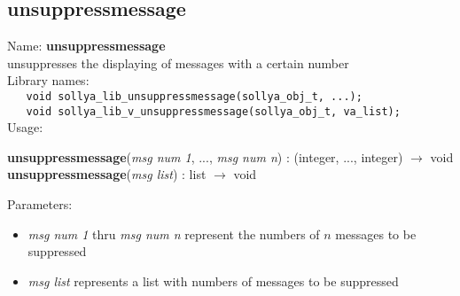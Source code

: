 \subsection{unsuppressmessage}
\label{labunsuppressmessage}
\noindent Name: \textbf{unsuppressmessage}\\
\phantom{aaa}unsuppresses the displaying of messages with a certain number\\[0.2cm]
\noindent Library names:\\
\verb|   void sollya_lib_unsuppressmessage(sollya_obj_t, ...);|\\
\verb|   void sollya_lib_v_unsuppressmessage(sollya_obj_t, va_list);|\\[0.2cm]
\noindent Usage: 
\begin{center}
\textbf{unsuppressmessage}(\emph{msg num 1}, ..., \emph{msg num n})   : (\textsf{integer}, ..., \textsf{integer}) $\rightarrow$ \textsf{void}\\
\textbf{unsuppressmessage}(\emph{msg list})   : \textsf{list} $\rightarrow$ \textsf{void}\\
\end{center}
Parameters: 
\begin{itemize}
\item \emph{msg num 1} thru \emph{msg num n} represent the numbers of $n$ messages to be suppressed
\item \emph{msg list} represents a list with numbers of messages to be suppressed
\end{itemize}
